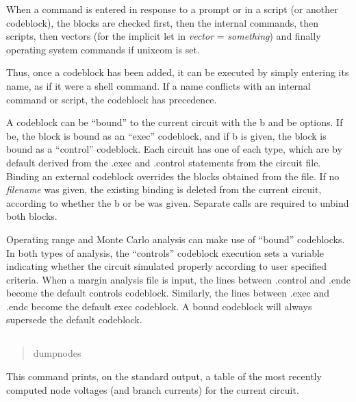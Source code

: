 When a command is entered in response to a prompt or in a script (or
another codeblock), the blocks are checked first, then the {\WRspice}
internal commands, then scripts, then vectors (for the implicit {\cb
let} in {\it vector} = {\it something\/}) and finally operating system
commands if {\et unixcom} is set.

Thus, once a codeblock has been added, it can be executed by simply
entering its name, as if it were a shell command.  If a name conflicts
with an internal command or script, the codeblock has precedence.

A codeblock can be ``bound'' to the current circuit with the {\vt b}
and {\vt be} options.  If {\vt be}, the block is bound as an ``exec''
codeblock, and if {\vt b} is given, the block is bound as a
``control'' codeblock.  Each circuit has one of each type, which are
by default derived from the {\vt .exec} and {\vt .control} statements
from the circuit file.  Binding an external codeblock overrides the
blocks obtained from the file.  If no {\it filename} was given, the
existing binding is deleted from the current circuit, according to
whether the {\vt b} or {\vt be} was given.  Separate calls are
required to unbind both blocks.

Operating range and Monte Carlo analysis can make use of ``bound''
codeblocks.  In both types of analysis, the ``controls'' codeblock
execution sets a variable indicating whether the circuit simulated
properly according to user specified criteria.  When a margin analysis
file is input, the lines between {\vt .control} and {\vt .endc} become
the default controls codeblock.  Similarly, the lines between {\vt
.exec} and {\vt .endc} become the default exec codeblock.  A bound
codeblock will always supersede the default codeblock.

\subsection{}


\begin{quote}\vt
dumpnodes
\end{quote}

This command prints, on the standard output, a table of the most
recently computed node voltages (and branch currents) for the current
circuit.

